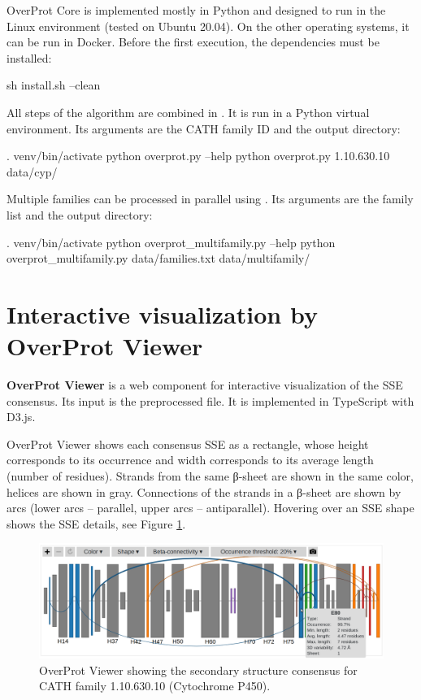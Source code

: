 \documentclass{article}
\begin{document}
OverProt Core is implemented mostly in Python 
and designed to run in the Linux environment (tested on Ubuntu 20.04).
On the other operating systems, it can be run in Docker.
Before the first execution, the dependencies must be installed:

\begin{codeblock}
  sh install.sh --clean
\end{codeblock}

All steps of the algorithm are combined in . 
It is run in a Python virtual environment. 
Its arguments are the CATH family ID and the output directory:

\begin{codeblock}
  . venv/bin/activate
  python overprot.py --help
  python overprot.py 1.10.630.10 data/cyp/
\end{codeblock}

Multiple families can be processed in parallel using . 
Its arguments are the family list and the output directory:

\begin{codeblock}
  . venv/bin/activate
  python overprot_multifamily.py --help
  python overprot_multifamily.py data/families.txt data/multifamily/
\end{codeblock}


\section{Interactive visualization by OverProt Viewer}

\textbf{OverProt Viewer} is a web component for interactive
visualization of the SSE consensus. Its input is the preprocessed
 file. It is implemented in TypeScript with D3.js.

OverProt Viewer shows each consensus SSE as a rectangle, whose height 
corresponds to its occurrence 
and width corresponds to its average length (number of residues). 
Strands from the same β-sheet are shown in the same color, helices are shown in gray. 
Connections of the strands in a β-sheet are shown by arcs 
(lower arcs -- parallel, upper arcs -- antiparallel). 
Hovering over an SSE shape shows the SSE details, see Figure \ref{fig:overprot_viewer}.

\begin{figure}[h!]
  \centering\includegraphics[width=\linewidth]{figures/overprot_viewer.png}
  \caption{OverProt Viewer showing the secondary structure consensus for CATH family 1.10.630.10 (Cytochrome P450).}
  \label{fig:overprot_viewer}
\end{figure}
\end{document}
